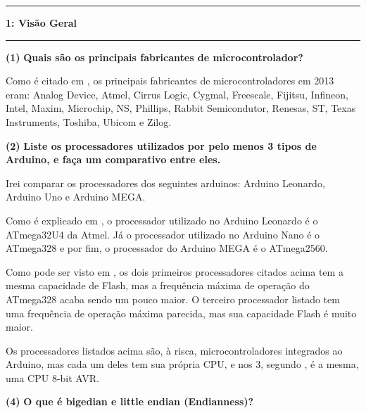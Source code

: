 \documentclass[11pt]{article}
\newcommand\question[2]{\vspace{.25in}\hrule\textbf{#1: #2}\vspace{.5em}\hrule\vspace{.10in}}
\renewcommand\part[1]{\vspace{.10in}\textbf{(#1)}}
\newcommand\principaisfabricantes{\vspace{.10in}\textbf{Quais são os principais fabricantes de microcontrolador? }}
\newcommand\listaprocessadores{\vspace{.10in}\textbf{Liste os processadores utilizados por pelo menos 3 tipos de Arduino, e faça um
		comparativo entre eles. }}
\newcommand\biglittleendian{\vspace{.10in}\textbf{O que é bigedian e little endian (Endianness)? }}
\begin{document}
\raggedright
\newcommand\NAME{Marcelo G de Andrade}  %
\newcommand\HWNUM{1}              %


\question{1}{Visão Geral} 

\part{1} \principaisfabricantes

 Como é citado em \cite{projeto_robos}, os principais fabricantes de microcontroladores em 2013 eram: Analog Device, Atmel, Cirrus Logic, Cygmal, Freescale, Fijitsu, Infineon, Intel, Maxim, Microchip, NS, Phillips, Rabbit Semicondutor, Renesas, ST, Texas Instruments, Toshiba, Ubicom e Zilog. 
 

\part{2} \listaprocessadores

Irei comparar os processadores dos seguintes arduinos: Arduino Leonardo, Arduino Uno e Arduino MEGA.

Como é explicado em \cite{processadores_arduino}, o processador utilizado no Arduino Leonardo é o ATmega32U4 da Atmel. Já o processador utilizado no Arduino Nano é o ATmega328 e por fim, o processador do Arduino MEGA é o ATmega2560. 

Como pode ser visto em \cite{atmel}, os dois primeiros processadores citados acima tem a mesma capacidade de Flash, mas a frequência máxima de operação do ATmega328 acaba sendo um pouco maior. O terceiro processador listado tem uma frequência de operação máxima parecida, mas sua capacidade Flash é muito maior.

Os processadores listados acima são, à risca, microcontroladores integrados ao Arduino, mas cada um deles tem sua própria CPU, e nos 3, segundo \cite{atmel}, é a mesma, uma CPU 8-bit AVR.

\part{4} \biglittleendian
\end{document}
